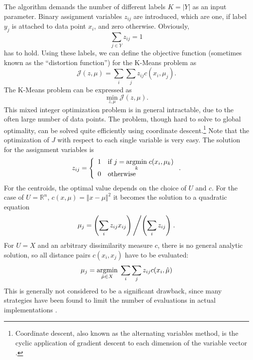 The algorithm demands the number of different labels $K=|Y|$ as an input parameter.
Binary assignment variables $z_{ij}$ are introduced, which are one, if label $y_j$ is attached to data point $x_i$, and zero otherwise.
Obviously,
\[\sum_{j\in Y}z_{ij} = 1\]
has to hold.
Using these labels, we can define the objective function (sometimes known as the ``distortion function'') for the K-Means problem as
\begin{equation}
  \label{eq:5}
  \mathcal{J}(z, \mu) = \sum_{i}\sum_{j}z_{ij}c(x_i, \mu_j).
\end{equation}
The K-Means problem can be expressed as
\begin{equation}
  \label{eq:3}
  \min\limits_{z, \mu}\mathcal{J}(z, \mu).
\end{equation}
This mixed integer optimization problem is in general intractable, due to the often large number of data points.
The problem, though hard to solve to global optimality, can be solved quite efficiently using coordinate descent.\footnote{Coordinate descent, also known as the alternating variables method, is the cyclic application of gradient descent to each dimension of the variable vector \cite{Nocedal1999}.}
Note that the optimization of $J$ with respect to each single variable is very easy.
The solution for the assignment variables is
\begin{equation}
  \label{eq:4}
  z_{ij} = \left\{\begin{array}{ll}1&\text{if }j=\underset{k}{\operatorname{argmin}}\; c(x_i,\mu_k)\\0&\text{otherwise} \end{array}\right. .
\end{equation}
For the centroids, the optimal value depends on the choice of $U$ and $c$.
For the case of $U=\mathbb{R}^n$, $c(x,\mu) = \Vert x-\mu\Vert^2$ it becomes the solution to a quadratic equation
\begin{equation}
  \label{eq:6}
  \mu_j = \left(\sum_{i}z_{ij}x_{ij}\right)\left / \left(\sum_{i}z_{ij}\right)\right. .
\end{equation}
For $U=X$ and an arbitrary dissimilarity measure $c$, there is no general analytic solution, so all distance pairs $c(x_i, x_j)$ have to be evaluated:
\begin{equation}
  \label{eq:7}
  \mu_j = \underset{\hat{\mu}\in X}{\operatorname{argmin}}\; \sum_{i}\sum_{j}z_{ij}c(x_i,\hat{\mu})
\end{equation}
This is generally not considered to be a significant drawback, since many strategies have been found to limit the number of evaluations in actual implementations \cite{Bishop2006}.

